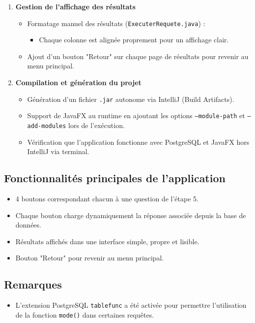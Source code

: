 \documentclass[12pt]{article}
\begin{document}
\begin{enumerate}
    \item \textbf{Gestion de l'affichage des résultats}
    \begin{itemize}
        \item Formatage manuel des résultats (\texttt{ExecuterRequete.java}) :
        \begin{itemize}
            \item Chaque colonne est alignée proprement pour un affichage clair.
        \end{itemize}
        \item Ajout d'un bouton "Retour" sur chaque page de résultats pour revenir au menu principal.
    \end{itemize}

    \item \textbf{Compilation et génération du projet}
    \begin{itemize}
        \item Génération d'un fichier \texttt{.jar} autonome via IntelliJ (Build Artifacts).
        \item Support de JavaFX au runtime en ajoutant les options \texttt{--module-path} et \texttt{--add-modules} lors de l'exécution.
        \item Vérification que l'application fonctionne avec PostgreSQL et JavaFX hors IntelliJ via terminal.
    \end{itemize}
\end{enumerate}

\subsection{Fonctionnalités principales de l'application}

\begin{itemize}
    \item 4 boutons correspondant chacun à une question de l'étape 5.
    \item Chaque bouton charge dynamiquement la réponse associée depuis la base de données.
    \item Résultats affichés dans une interface simple, propre et lisible.
    \item Bouton "Retour" pour revenir au menu principal.
\end{itemize}

\subsection{Remarques}

\begin{itemize}
    \item L'extension PostgreSQL \texttt{tablefunc} a été activée pour permettre l'utilisation de la fonction \texttt{mode()} dans certaines requêtes.
\end{itemize}
\end{document}
